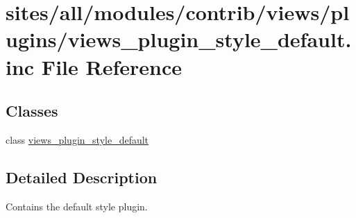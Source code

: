 \hypertarget{views__plugin__style__default_8inc}{
\section{sites/all/modules/contrib/views/plugins/views\_\-plugin\_\-style\_\-default.inc File Reference}
\label{views__plugin__style__default_8inc}
}
\subsection*{Classes}
\begin{CompactItemize}
\item 
class \hyperlink{classviews__plugin__style__default}{views\_\-plugin\_\-style\_\-default}
\end{CompactItemize}


\subsection{Detailed Description}
Contains the default style plugin. 
